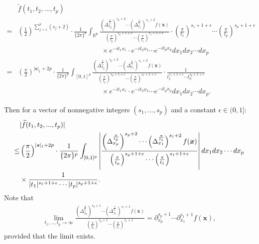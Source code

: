 \documentclass[11pt]{article}
\numberwithin{equation}{section}
\begin{document}
\begin{align*}
	&\widetilde{f}(t_1,t_2,...,t_p)\\
	=&\left(\frac{1}{2}\right)^{\sum_{j=1}^p(s_j+2)}\cdot\frac{1}{\{2\pi\}^{p}}\int_{\mathbb{R}^p}\frac{\left(\Delta_{x_p}^{\frac{\pi}{t_p}}\right)^{s_p+2}\cdots \left(\Delta_{x_{1}}^{\frac{\pi}{t_{1}}}\right)^{s_{1}+2}f(\boldsymbol{x})}{\left(\frac{\pi}{t_p}\right)^{s_p+1+\epsilon}\cdots \left(\frac{\pi}{t_1}\right)^{s_1+1+\epsilon}} \cdot \left(\frac{\pi}{t_{1}}\right)^{s_{1}+1+\epsilon}\cdots \left(\frac{\pi}{t_p}\right)^{s_p+1+\epsilon} \\
	&\qquad\qquad \qquad\qquad  \qquad\qquad \times e^{-it_1x_1}\cdot e^{-it_2x_2}\cdots e^{-it_px_p}dx_1dx_2\cdots dx_p\\
	=&\left(\frac{\pi}{2}\right)^{|\boldsymbol{s}|_1+2p}\cdot\frac{1}{\{2\pi\}^{p}}\int_{[0,1]^p}\frac{\left(\Delta_{x_p}^{\frac{\pi}{t_p}}\right)^{s_p+2}\cdots \left(\Delta_{x_{1}}^{\frac{\pi}{t_{1}}}\right)^{s_{1}+2}f(\boldsymbol{x})}{\left(\frac{\pi}{t_p}\right)^{s_p+1+\epsilon}\cdots \left(\frac{\pi}{t_1}\right)^{s_1+1+\epsilon}} \cdot \frac{1}{t^{s_{1}+1+\epsilon}_{1}\cdots t_p^{s_p+1+\epsilon}} \\
	&\qquad\qquad \qquad\qquad  \qquad\qquad \times e^{-it_1x_1}\cdot e^{-it_2x_2}\cdots e^{-it_px_p}dx_1dx_2\cdots dx_p.
\end{align*}



Then for a vector of nonnegative integers $(s_1,...,s_p)$ and a constant $\epsilon\in(0,1]$:
\begin{align}
	&|\widetilde{f}(t_1,t_2,...,t_p)|  \label{eq:ftilde_bound}\\
	\leq& \left(\frac{\pi}{2}\right)^{|\boldsymbol{s}|_1+2p}\cdot\frac{1}{\{2\pi\}^{p}}\int_{[0,1]^p}\left|\frac{\left(\Delta_{x_p}^{\frac{\pi}{t_p}}\right)^{s_p+2}\cdots \left(\Delta_{x_{1}}^{\frac{\pi}{t_{1}}}\right)^{s_{1}+2}f(\boldsymbol{x})}{\left(\frac{\pi}{t_p}\right)^{s_p+1+\epsilon}\cdots \left(\frac{\pi}{t_1}\right)^{s_1+1+\epsilon}}\right| dx_1dx_2\cdots dx_p\\
	&\times  \frac{1}{|t_{1}|^{s_{1}+1+\epsilon}\cdots |t_p|^{s_p+1+\epsilon}}.\notag
\end{align}
Note that
\begin{align*}
	\lim_{t_{1},...,t_p\to\infty}\frac{\left(\Delta_{x_p}^{\frac{\pi}{t_p}}\right)^{s_p+1}\cdots \left(\Delta_{x_{1}}^{\frac{\pi}{t_{1}}}\right)^{s_{1}+1}f(\boldsymbol{x})}{\left(\frac{\pi}{t_p}\right)^{s_p+1}\cdots \left(\frac{\pi}{t_1}\right)^{s_1+1}}=\partial_{x_p}^{s_p+1}\cdots\partial_{x_{1}}^{s_{1}+1}f(\boldsymbol{x}),
\end{align*}
provided that the limit exists.
\end{document}
